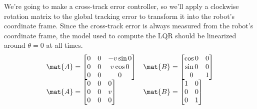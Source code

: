 We're going to make a cross-track error controller, so we'll apply a clockwise
rotation matrix to the global tracking error to transform it into the robot's
coordinate frame. Since the cross-track error is always measured from the
robot's coordinate frame, the \gls{model} used to compute the LQR should be
linearized around $\theta = 0$ at all times.
\begin{equation*}
  \begin{array}{ll}
    \mat{A} =
    \begin{bmatrix}
      0 & 0 & -v\sin 0 \\
      0 & 0 & v\cos 0 \\
      0 & 0 & 0
    \end{bmatrix} &
    \mat{B} =
    \begin{bmatrix}
      \cos 0 & 0 \\
      \sin 0 & 0 \\
      0 & 1
    \end{bmatrix} \\
    \mat{A} =
    \begin{bmatrix}
      0 & 0 & 0 \\
      0 & 0 & v \\
      0 & 0 & 0
    \end{bmatrix} &
    \mat{B} =
    \begin{bmatrix}
      1 & 0 \\
      0 & 0 \\
      0 & 1
    \end{bmatrix}
  \end{array}
\end{equation*}

